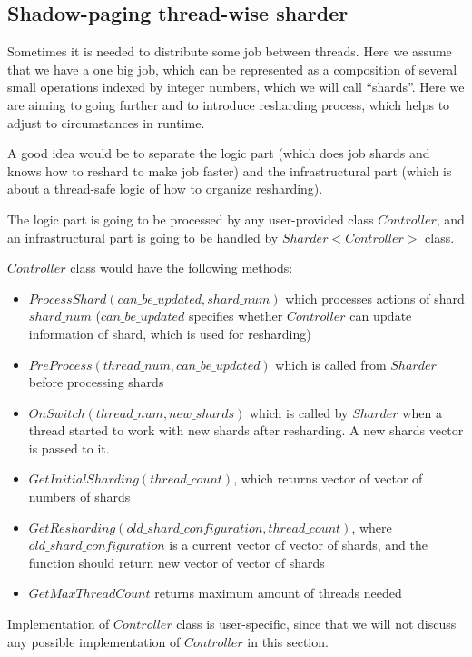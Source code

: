 \documentclass{article}
\begin{document}
\subsection{Shadow-paging thread-wise sharder}
\label{subsec:shadow_page_thread_wise_sharder}

Sometimes it is needed to distribute some job between threads. Here we assume that we have a one big job, which can be represented as a composition of several small operations indexed by integer numbers, which we will call ``shards''. Here we are aiming to going further and to introduce resharding process, which helps to adjust to circumstances in runtime.

A good idea would be to separate the logic part (which does job shards and knows how to reshard to make job faster) and the infrastructural part (which is about a thread-safe logic of how to organize resharding).

The logic part is going to be processed by any user-provided class $Controller$, and an infrastructural part is going to be handled by $Sharder<Controller>$ class.

$Controller$ class would have the following methods:
\begin{itemize}
	\item $ProcessShard(can\_be\_updated, shard\_num)$ which processes actions of shard $shard\_num$ ($can\_be\_updated$ specifies whether $Controller$ can update information of shard, which is used for resharding)
	\item $PreProcess(thread\_num, can\_be\_updated)$ which is called from $Sharder$ before processing shards
	\item $OnSwitch(thread\_num, new\_shards)$ which is called by $Sharder$ when a thread started to work with new shards after resharding. A new shards vector is passed to it.
	\item $GetInitialSharding(thread\_count)$, which returns vector of vector of numbers of shards
	\item $GetResharding(old\_shard\_configuration, thread\_count)$, where $old\_shard\_configuration$ is a current vector of vector of shards, and the function should return new vector of vector of shards
	\item $GetMaxThreadCount$ returns maximum amount of threads needed
\end{itemize}

Implementation of $Controller$ class is user-specific, since that we will not discuss any possible implementation of $Controller$ in this section.
\end{document}
